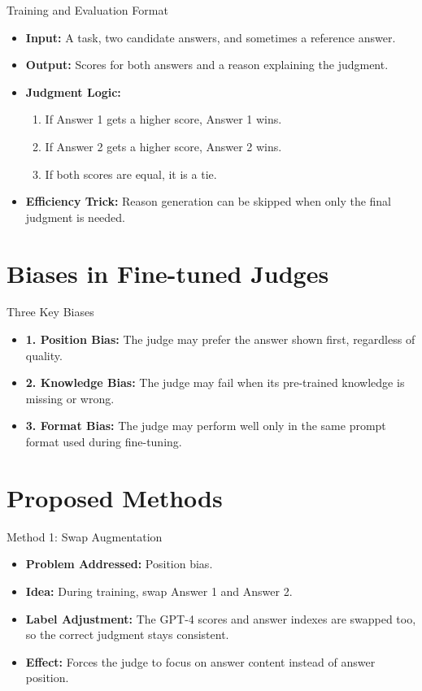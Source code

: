 \documentclass[10pt]{beamer}
\begin{document}
\begin{frame}{Training and Evaluation Format}
	\begin{itemize}
		\item \textbf{Input:} A task, two candidate answers, and sometimes a reference answer.
		\item \textbf{Output:} Scores for both answers and a reason explaining the judgment.
		\item \textbf{Judgment Logic:}
		\begin{enumerate}
			\item If Answer 1 gets a higher score, Answer 1 wins.
			\item If Answer 2 gets a higher score, Answer 2 wins.
			\item If both scores are equal, it is a tie.
		\end{enumerate}
		\item \textbf{Efficiency Trick:} Reason generation can be skipped when only the final judgment is needed.
	\end{itemize}
\end{frame}

\section{Biases in Fine-tuned Judges}

\begin{frame}{Three Key Biases}
	\begin{itemize}
		\item \textbf{1. Position Bias:} The judge may prefer the answer shown first, regardless of quality.
		\item \textbf{2. Knowledge Bias:} The judge may fail when its pre-trained knowledge is missing or wrong.
		\item \textbf{3. Format Bias:} The judge may perform well only in the same prompt format used during fine-tuning.
	\end{itemize}
\end{frame}

\section{Proposed Methods}

\begin{frame}{Method 1: Swap Augmentation}
	\begin{itemize}
		\item \textbf{Problem Addressed:} Position bias.
		\item \textbf{Idea:} During training, swap Answer 1 and Answer 2.
		\item \textbf{Label Adjustment:} The GPT-4 scores and answer indexes are swapped too, so the correct judgment stays consistent.
		\item \textbf{Effect:} Forces the judge to focus on answer content instead of answer position.
	\end{itemize}
\end{frame}
\end{document}
